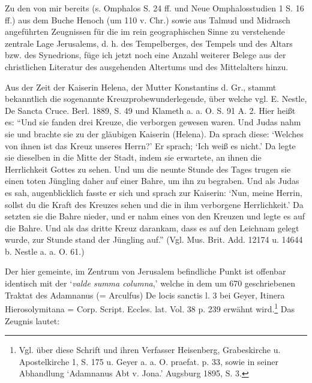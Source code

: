 \documentclass[a4paper, 11pt, oneside]{article}
\begin{document}
Zu den von mir bereits (s. Omphalos S. 24 ff. und Neue Omphalosstudien 1 S. 16 ff.) aus dem Buche Henoch (um 110 v. Chr.) sowie aus Talmud und Midrasch angeführten Zeugnissen für die im rein geographischen Sinne zu verstehende zentrale Lage Jerusalems, d. h. des Tempelberges, des Tempels und des Altars bzw. des Synedrions, füge ich jetzt noch eine Anzahl weiterer Belege aus der christlichen Literatur des ausgehenden Altertums und des Mittelalters hinzu.

Aus der Zeit der Kaiserin Helena, der Mutter Konstantins d. Gr., stammt bekanntlich die sogenannte Kreuzprobewunderlegende, über welche vgl. E. Nestle, De Sancta Cruce. Berl. 1889, S. 49 und Klameth a. a. O. S. 91 A. 2. Hier heißt es: "`Und sie fanden drei Kreuze, die verborgen gewesen waren. Und Judas nahm sie und brachte sie zu der gläubigen Kaiserin (Helena). Da sprach diese: `Welches von ihnen ist das Kreuz unseres Herrn?' Er sprach; `Ich weiß es nicht.' Da legte sie dieselben in die Mitte der Stadt, indem sie erwartete, an ihnen die Herrlichkeit Gottes zu sehen. Und um die neunte Stunde des Tages trugen sie einen toten Jüngling daher auf einer Bahre, um ihn zu begraben. Und als Judas es sah, augenblicklich fasste er sich und sprach zur Kaiserin: `Nun, meine Herrin, sollst du die Kraft des Kreuzes sehen und die in ihm verborgene Herrlichkeit.' Da setzten sie die Bahre nieder, und er nahm eines von den Kreuzen und legte es auf die Bahre. Und als das dritte Kreuz darankam, dass es auf den Leichnam gelegt wurde, zur Stunde stand der Jüngling auf."' (Vgl. Mus. Brit. Add. 12174 u. 14644 b. Nestle a. a. O. 61.)

Der hier gemeinte, im Zentrum von Jerusalem befindliche Punkt ist offenbar identisch mit der `\emph{valde summa columna},' welche in dem um 670 geschriebenen Traktat des Adamnanus (= Arculfus) De locis sanctis l. 3 bei Geyer, Itinera Hierosolymitana = Corp. Script. Eccles. lat. Vol. 38 p. 239 erwähnt wird.\footnote{Vgl. über diese Schrift und ihren Verfasser Heisenberg, Grabeskirche u. Apostelkirche 1, S. 175 u. Geyer a. a. O. praefat. p. 33, sowie in seiner Abhandlung `Adamnanus Abt v. Jona.' Augsburg 1895, S. 3.} Das Zeugnis lautet:
\end{document}
